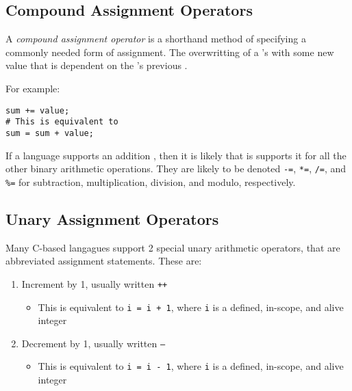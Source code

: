 \subsection{Compound Assignment Operators}\label{subsec:Compound_Assignment_Operators}
\begin{definition}\label{def:Compound_Assignment_Operator}
  A \emph{compound assignment operator} is a shorthand method of specifying a commonly needed form of assignment.
  The overwritting of a 's  with some new value that is dependent on the 's previous .

  For example:
\begin{verbatim}
sum += value;
# This is equivalent to
sum = sum + value;
\end{verbatim}

  \begin{remark}\label{rmk:Supported_Compount_Assignment_Operators}
    If a language supports an addition , then it is likely that is supports it for all the other binary arithmetic operations.
    They are likely to be denoted \texttt{-=}, \texttt{*=}, \texttt{/=}, and \texttt{\%=} for subtraction, multiplication, division, and modulo, respectively.
  \end{remark}
\end{definition}

\subsection{Unary Assignment Operators}\label{subsec:Unary_Assignment_Operators}
Many C-based langagues support 2 special unary arithmetic operators, that are abbreviated assignment statements.
These are:
\begin{enumerate}[noitemsep]
\item Increment by 1, usually written \texttt{++}
  \begin{itemize}[noitemsep]
  \item This is equivalent to \texttt{i = i + 1}, where \texttt{i} is a defined, in-scope, and alive integer 
  \end{itemize}
\item Decrement by 1, usually written \texttt{--}
  \begin{itemize}[noitemsep]
  \item This is equivalent to \texttt{i = i - 1}, where \texttt{i} is a defined, in-scope, and alive integer 
  \end{itemize}
\end{enumerate}

